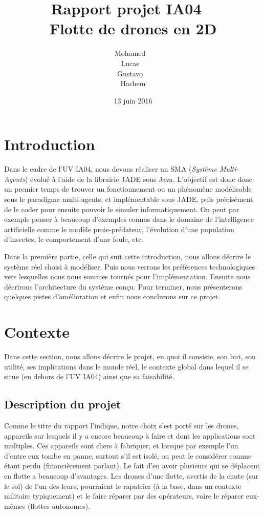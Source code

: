 \documentclass[11pt]{report}
\title{Rapport projet IA04 ~\\ Flotte de drones en 2D}
\author
{
	Mohamed \bsc{Baaziz} ~\\ 
	Lucas \bsc{Sorin} ~\\ 
	Gustavo \bsc{Cabrera} ~\\ 
	Hachem \bsc{Benyahia}
}
\date{13 juin 2016}
\begin{document}
\maketitle
\renewcommand{\contentsname}{\centering Sommaire \vspace*{1cm}}
\tableofcontents

\newpage

\section{Introduction}

Dans le cadre de l'UV IA04, nous devons réaliser un SMA (\textit{Système Multi-Agents}) évolué à l'aide de la librairie JADE sous Java. L'objectif est donc donc un premier temps de trouver un fonctionnement ou un phénomène modélisable sous le paradigme multi-agents, et implémentable sous JADE, puis précisément de le coder pour ensuite pouvoir le simuler informatiquement. On peut par exemple penser à beaucoup d'exemples connus dans le domaine de l'intelligence artificielle comme le modèle proie-prédateur, l'évolution d'une population d'insectes, le comportement d'une foule, etc. 

Dans la première partie, celle qui suit cette introduction, nous allons décrire le système réel choisi à modéliser. Puis nous verrons les préférences technologiques vers lesquelles nous nous sommes tournés pour l'implémentation. Ensuite nous décrirons l'architecture du système conçu. Pour terminer, nous présenterons quelques pistes d'amélioration et enfin nous conclurons sur ce projet.

\section{Contexte}

Dans cette section, nous allons décrire le projet, en quoi il consiste, son but, son utilité, ses implications dans le monde réel, le contexte global dans lequel il se situe (en dehors de l'UV IA04) ainsi que sa faisabilité.

\subsection{Description du projet}

Comme le titre du rapport l'indique, notre choix s'est porté sur les drones, appareils sur lesquels il y a encore beaucoup à faire et dont les applications sont multiples. Ces appareils sont chers à fabriquer, et lorsque par exemple l'un d'entre eux tombe en panne, surtout s'il est isolé, on peut le considérer comme étant perdu (financièrement parlant). Le fait d'en avoir plusieurs qui se déplacent en flotte a beaucoup d'avantages. Les drones d'une flotte, avertis de la chute (sur le sol) de l'un des leurs, pourraient le rapatrier (à la base, dans un contexte militaire typiquement) et le faire réparer par des opérateurs, voire le réparer eux-mêmes (flottes autonomes).
\end{document}
